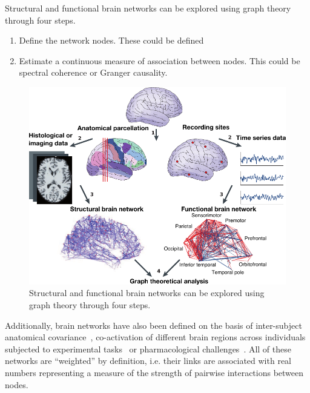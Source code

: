 Structural and functional brain networks can be explored using graph theory through four steps.
\begin{enumerate}
\item Define the network nodes. These could be defined 
\item Estimate a continuous measure of association between nodes. This could be spectral coherence or Granger causality.
\end{enumerate}
\begin{figure}[htb!]
\centering
\includegraphics[width=1.0\textwidth]{images/bullmore_2009_pipeline.pdf}
\caption{Structural and functional brain networks can be explored using graph theory through four steps.}
\end{figure}

Additionally, brain networks have also been defined on the basis of inter-subject anatomical covariance~\cite{Evans2013}, co-activation of different brain regions across individuals subjected to experimental tasks~\cite{crossley2013a} or pharmacological challenges~\cite{Schwarz2007,schwarz2008}.
All of these networks are ``weighted'' by definition, i.e. their links are associated with real numbers representing a measure of the strength of pairwise interactions between nodes.




